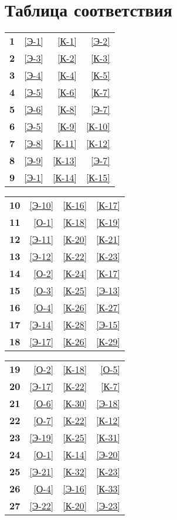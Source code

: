 \documentclass[12pt]{article}
\newcommand{\eR}[1]{\ref{Э-#1}}
\newcommand{\oR}[1]{\ref{О-#1}}
\newcommand{\kR}[1]{\ref{К-#1}}
\begin{document}
\clearpage

%
\section*{Таблица соответствия}
%

\begin{multicols}{3}

\begin{tabular}{c|rrr}
\textbf{1}  & \eR{1} & \kR{1} & \eR{2} \\
\textbf{2}  & \eR{3} & \kR{2} & \kR{3} \\
\textbf{3}  & \eR{4} & \kR{4} & \kR{5} \\
\textbf{4}  & \eR{5} & \kR{6} & \kR{7} \\
\textbf{5}  & \eR{6} & \kR{8} & \eR{7} \\
\textbf{6}  & \eR{5} & \kR{9} & \kR{10} \\
\textbf{7}  & \eR{8} & \kR{11} & \kR{12} \\
\textbf{8}  & \eR{9} & \kR{13} & \eR{7} \\
\textbf{9}  & \eR{1} & \kR{14} & \kR{15} \\
\end{tabular}

\begin{tabular}{c|rrr}
\textbf{10} & \eR{10} & \kR{16} & \kR{17} \\
\textbf{11} & \oR{1} & \kR{18} & \kR{19} \\
\textbf{12} & \eR{11} & \kR{20} & \kR{21} \\
\textbf{13} & \eR{12} & \kR{22} & \kR{23} \\
\textbf{14} & \oR{2} & \kR{24} & \kR{17} \\
\textbf{15} & \oR{3} & \kR{25} & \eR{13} \\
\textbf{16} & \oR{4} & \kR{26} & \kR{27} \\
\textbf{17} & \eR{14} & \kR{28} & \eR{15} \\
\textbf{18} & \eR{17} & \kR{26} & \kR{29} \\
\end{tabular}

\begin{tabular}{c|rrr}
\textbf{19} & \oR{2} & \kR{18} & \oR{5} \\
\textbf{20} & \eR{17} & \kR{22} & \kR{7} \\
\textbf{21} & \oR{6} & \kR{30} & \eR{18} \\
\textbf{22} & \oR{7} & \kR{22} & \kR{12} \\
\textbf{23} & \eR{19} & \kR{25} & \kR{31} \\
\textbf{24} & \oR{1} & \kR{14} & \eR{20} \\
\textbf{25} & \eR{21} & \kR{32} & \kR{23} \\
\textbf{26} & \oR{4} & \eR{16} & \kR{33} \\
\textbf{27} & \eR{22} & \kR{20} & \eR{23} \\
\end{tabular}

\end{multicols}
\end{document}
